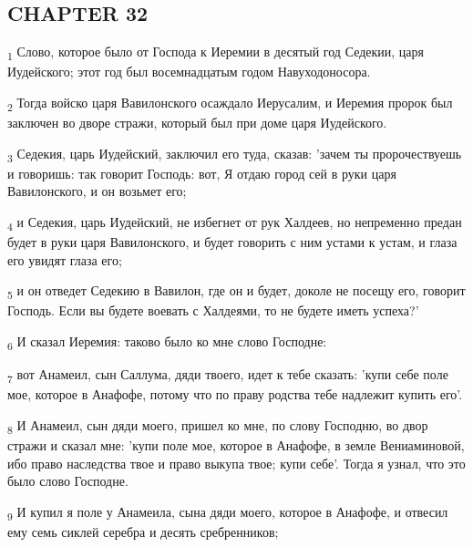 \subsection{CHAPTER 32}
\begin{tcolorbox}
\textsubscript{1} Слово, которое было от Господа к Иеремии в десятый год Седекии, царя Иудейского; этот год был восемнадцатым годом Навуходоносора.
\end{tcolorbox}
\begin{tcolorbox}
\textsubscript{2} Тогда войско царя Вавилонского осаждало Иерусалим, и Иеремия пророк был заключен во дворе стражи, который был при доме царя Иудейского.
\end{tcolorbox}
\begin{tcolorbox}
\textsubscript{3} Седекия, царь Иудейский, заключил его туда, сказав: 'зачем ты пророчествуешь и говоришь: так говорит Господь: вот, Я отдаю город сей в руки царя Вавилонского, и он возьмет его;
\end{tcolorbox}
\begin{tcolorbox}
\textsubscript{4} и Седекия, царь Иудейский, не избегнет от рук Халдеев, но непременно предан будет в руки царя Вавилонского, и будет говорить с ним устами к устам, и глаза его увидят глаза его;
\end{tcolorbox}
\begin{tcolorbox}
\textsubscript{5} и он отведет Седекию в Вавилон, где он и будет, доколе не посещу его, говорит Господь. Если вы будете воевать с Халдеями, то не будете иметь успеха?'
\end{tcolorbox}
\begin{tcolorbox}
\textsubscript{6} И сказал Иеремия: таково было ко мне слово Господне:
\end{tcolorbox}
\begin{tcolorbox}
\textsubscript{7} вот Анамеил, сын Саллума, дяди твоего, идет к тебе сказать: 'купи себе поле мое, которое в Анафофе, потому что по праву родства тебе надлежит купить его'.
\end{tcolorbox}
\begin{tcolorbox}
\textsubscript{8} И Анамеил, сын дяди моего, пришел ко мне, по слову Господню, во двор стражи и сказал мне: 'купи поле мое, которое в Анафофе, в земле Вениаминовой, ибо право наследства твое и право выкупа твое; купи себе'. Тогда я узнал, что это было слово Господне.
\end{tcolorbox}
\begin{tcolorbox}
\textsubscript{9} И купил я поле у Анамеила, сына дяди моего, которое в Анафофе, и отвесил ему семь сиклей серебра и десять сребренников;
\end{tcolorbox}
